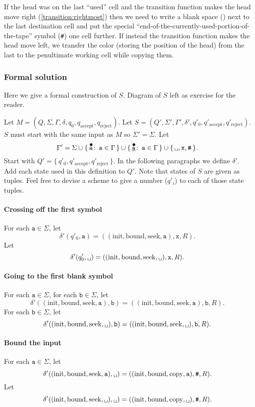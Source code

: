 \documentclass{article}
\newcommand\obullet[1]{\ThisStyle{\ensurestackMath{%
  \stackon[1pt]{\SavedStyle#1}{\SavedStyle\kern.6\LMpt\bullet}}}}
\newcommand{\0}{\texttt{\textvisiblespace}}
\newcommand{\°}{\obullet{\0}}
\newcommand{\A}{\obullet{\s}}
\newcommand{\HA}{\obullet{\underline{\s}}}
\newcommand{\s}{\texttt{a}}
\newcommand{\w}{\texttt{b}}
\newcommand{\X}{\texttt{x}}
\newcommand{\e}{\texttt{\#}}
\newcommand{\st}{\colon\,}
\newcommand{\qpz}{q'_0}
\newcommand{\qpa}{q'_\text{accept}}
\newcommand{\qpr}{q'_\text{reject}}
\begin{document}
If the head was on the last ``used'' cell and the transition function makes
the head move right (\ref{transition:rightmost}) then we need to write a blank space (\°{}) next to the
last destination
cell and put the special
``end-of-the-currently-used-portion-of-the-tape'' symbol (\e)
one cell further. If instead the transition function makes the head move left,
we transfer the color (storing the position of the head) from the last
to the penultimate working cell while copying them.

\subsubsection{Formal solution}
Here we give a formal construction of $S$.
Diagram of $S$ left as exercise for the reader.

Let $M=(Q,\Sigma,\Gamma,\delta,q_0,q_{\text{accept}},q_{\text{reject}})$.
Let $S=(Q',\Sigma',\Gamma',\delta',\qpz,\qpa,\qpr)$.
$S$ must start with the same input as $M$ so $\Sigma'=\Sigma$. Let
$$\Gamma' = \Sigma \cup \{\,\A \st \s \in \Gamma\,\} \cup
\{\,\HA \st \s \in \Gamma\,\} \cup \{\,\0{}, \X, \e\,\}.$$
Start with $Q' = \{\,\qpz,\qpa,\qpr\,\}$. In the following paragraphs we define
$\delta'$. Add each state used in this definition to $Q'$.
Note that states of $S$ are given as tuples. Feel free to devise a scheme to
give a number ($q'_i$) to each of those state tuples.

\paragraph{Crossing off the first symbol}
For each $\s \in \Sigma$,
let $$\delta'(\qpz,\s)
= ((\text{init},\text{bound}, \text{seek}, \s), \X, R).$$
Let $$\delta'(\qpz,\0{})
= ((\text{init},\text{bound}, \text{seek}, \0{}), \X, R).$$

\paragraph{Going to the first blank symbol}
For each $\s \in \Sigma$,
for each $\w \in \Sigma$,
let $$\delta'((\text{init},\text{bound}, \text{seek}, \s), \w)
= ((\text{init},\text{bound}, \text{seek}, \s), \w, R).$$
For each $\w \in \Sigma$,
let $$\delta'((\text{init},\text{bound}, \text{seek}, \0{}), \w)
= ((\text{init},\text{bound}, \text{seek}, \0{}), \w, R).$$

\paragraph{Bound the input}
For each $\s \in \Sigma$,
let $$\delta'((\text{init},\text{bound}, \text{seek}, \s), \0{})
= ((\text{init},\text{bound},\text{copy}, \s), \e, R).$$
Let $$\delta'((\text{init},\text{bound}, \text{seek}, \0{}), \0{})
= ((\text{init},\text{bound},\text{copy}, \0{}), \e, R).$$
\end{document}
